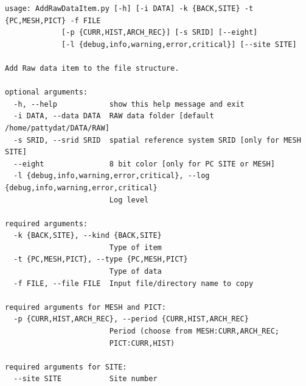 \begin{Verbatim}[fontfamily=courier,commandchars=\\\{\},fontsize=\footnotesize]
 usage: AddRawDataItem.py [-h] [-i DATA] -k {BACK,SITE} -t {PC,MESH,PICT} -f FILE                                                                                                     
             [-p {CURR,HIST,ARCH_REC}] [-s SRID] [--eight]
             [-l {debug,info,warning,error,critical}] [--site SITE]

Add Raw data item to the file structure.

optional arguments:
  -h, --help            show this help message and exit
  -i DATA, --data DATA  RAW data folder [default /home/pattydat/DATA/RAW]
  -s SRID, --srid SRID  spatial reference system SRID [only for MESH SITE]
  --eight               8 bit color [only for PC SITE or MESH]
  -l {debug,info,warning,error,critical}, --log {debug,info,warning,error,critical}
                        Log level

required arguments:
  -k {BACK,SITE}, --kind {BACK,SITE}
                        Type of item
  -t {PC,MESH,PICT}, --type {PC,MESH,PICT}
                        Type of data
  -f FILE, --file FILE  Input file/directory name to copy

required arguments for MESH and PICT:
  -p {CURR,HIST,ARCH_REC}, --period {CURR,HIST,ARCH_REC}
                        Period (choose from MESH:CURR,ARCH_REC;
                        PICT:CURR,HIST)

required arguments for SITE:
  --site SITE           Site number
\end{Verbatim}

